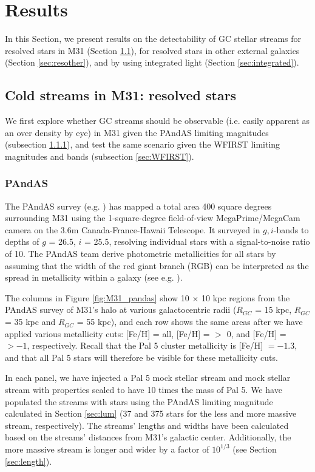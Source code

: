 \documentclass[twocolumn]{aastex62}
\begin{document}
\section{Results}\label{sec:results}
In this Section, we present results on the detectability of GC stellar streams for resolved stars in M31 (Section \ref{sec:resolved}), for resolved stars in other external galaxies (Section \ref{sec:resother}), and by using integrated light (Section \ref{sec:integrated}). 
 

\subsection{Cold streams in M31: resolved stars}
\label{sec:resolved}
We first explore whether GC streams should be observable (i.e. easily apparent as an over density by eye)  in M31 given the PAndAS limiting magnitudes (subsection \ref{sec:PANDAS}), and test the same scenario given the WFIRST limiting magnitudes and bands (subsection \ref{sec:WFIRST}). %


\subsubsection{PAndAS}
\label{sec:PANDAS}
The PAndAS survey (e.g. \citealt{mcconnachie09}) has mapped a total area 400 square degrees surrounding M31 using the 1-square-degree field-of-view MegaPrime/MegaCam camera on the 3.6m Canada-France-Hawaii Telescope. It surveyed in $g, i$-bands to depths of $g$ = 26.5, $i$ = 25.5, resolving individual stars with a signal-to-noise ratio of 10. The PAndAS team derive photometric metallicities for all stars by assuming that the width of the red giant branch (RGB) can be interpreted as the spread in metallicity within a galaxy (see e.g. \citealt{crno14}).

The columns in Figure \ref{fig:M31_pandas} show 10 $\times$ 10 kpc regions from the PAndAS survey of M31's halo at various galactocentric radii ($R_{GC}$ = 15  kpc, $R_{GC}$ = 35 kpc and $R_{GC}$ = 55 kpc), and each row shows the same areas after we have applied various metallicity cuts: [Fe/H] = all,  [Fe/H] = $>$ 0, and  [Fe/H] = $> -1 $, respectively. Recall that the Pal 5 cluster metallicity is  [Fe/H] $= -1.3$, and that all Pal 5 stars will therefore be visible for these metallicity cuts. 

In each panel, we have injected a Pal 5 mock stellar stream and mock stellar stream with properties scaled to have 10 times the mass of Pal 5. We have populated the streams with stars using the PAndAS limiting magnitude calculated in Section \ref{sec:lum} (37 and 375 stars for the less and more massive stream, respectively).  The streams' lengths and widths have been calculated based on the streams' distances from M31's galactic center. Additionally, the more massive stream is longer and wider by a factor of $10^{1/3}$ (see Section \ref{sec:length}). 
\end{document}

